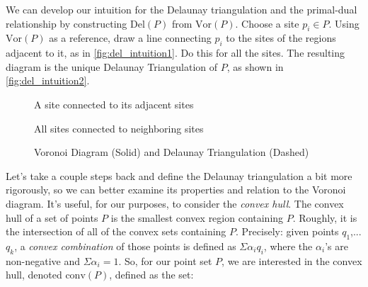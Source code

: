 \documentclass[12pt,twoside]{reedthesis}
\begin{document}
    We can develop our intuition for the Delaunay triangulation and the primal-dual relationship by constructing $\mbox{Del}(P)$ from $\mbox{Vor}(P)$. Choose a site $p_{i} \in P$. Using $\mbox{Vor}(P)$ as a reference, draw a line connecting $p_{i}$ to the sites of the regions adjacent to it, as in \cref{fig:del_intuition1}. Do this for all the sites. The resulting diagram is the unique Delaunay Triangulation of $P$, as shown in \cref{fig:del_intuition2}.

    \begin{figure}[!htb]
      \centering
      \begin{subtable}{.475\textwidth}
        
        \caption{A site connected to its adjacent sites}
        \label{fig:del_intuition1}
      \end{subtable}%
      \begin{subtable}{.475\textwidth}
        
        \caption{All sites connected to neighboring sites}
        \label{fig:del_intuition2}
      \end{subtable}
      \caption{Voronoi Diagram (Solid) and Delaunay Triangulation (Dashed)}
      \label{fig:del_intuition}
    \end{figure}


    Let's take a couple steps back and define the Delaunay triangulation a bit more rigorously, so we can better examine its properties and relation to the Voronoi diagram. It's useful, for our purposes, to consider the \emph{convex hull}. The convex hull of a set of points $P$ is the smallest convex region containing $P$. Roughly, it is the intersection of all of the convex sets containing $P$. Precisely: given points $q_{1}$,... $q_{k}$, a \emph{convex combination} of those points is defined as $\Sigma\alpha_{i}q_{i}$, where the $\alpha_{i}$'s are non-negative and $\Sigma\alpha_{i}=1.$  So, for our point set $P$, we are interested in the convex hull, denoted $\mbox{conv}(P)$, defined as the set:
\end{document}
